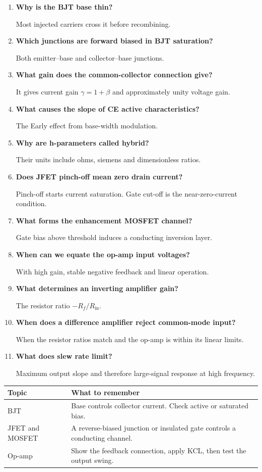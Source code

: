 \documentclass[12pt,a4paper]{article}
\newcommand{\Q}[1]{\textbf{#1}\par\noindent\ignorespaces}
\begin{document}
\begin{tcolorbox}[exambox, title={Frequently Asked / Viva Questions}]
\begin{enumerate}[topsep=0pt, label=\textbf{Q\arabic*.}, itemsep=5pt]
  \item \Q{Why is the BJT base thin?} Most injected carriers cross it before recombining.
  \item \Q{Which junctions are forward biased in BJT saturation?} Both emitter--base and collector--base junctions.
  \item \Q{What gain does the common-collector connection give?} It gives current gain $\gamma=1+\beta$ and approximately unity voltage gain.
  \item \Q{What causes the slope of CE active characteristics?} The Early effect from base-width modulation.
  \item \Q{Why are h-parameters called hybrid?} Their units include ohms, siemens and dimensionless ratios.
  \item \Q{Does JFET pinch-off mean zero drain current?} Pinch-off starts current saturation. Gate cut-off is the near-zero-current condition.
  \item \Q{What forms the enhancement MOSFET channel?} Gate bias above threshold induces a conducting inversion layer.
  \item \Q{When can we equate the op-amp input voltages?} With high gain, stable negative feedback and linear operation.
  \item \Q{What determines an inverting amplifier gain?} The resistor ratio $-R_f/R_{\mathrm{in}}$.
  \item \Q{When does a difference amplifier reject common-mode input?} When the resistor ratios match and the op-amp is within its linear limits.
  \item \Q{What does slew rate limit?} Maximum output slope and therefore large-signal response at high frequency.
\end{enumerate}
\end{tcolorbox}

\begin{tcolorbox}[tikzbox, title={Summary Reference}]
\begin{tabularx}{\linewidth}{|B{4.0cm}|Y|}\hline
Topic & \textbf{What to remember} \\ \hline
BJT & Base controls collector current. Check active or saturated bias. \\ \hline
JFET and MOSFET & A reverse-biased junction or insulated gate controls a conducting channel. \\ \hline
Op-amp & Show the feedback connection, apply KCL, then test the output swing. \\ \hline
\end{tabularx}
\end{tcolorbox}
\end{document}

